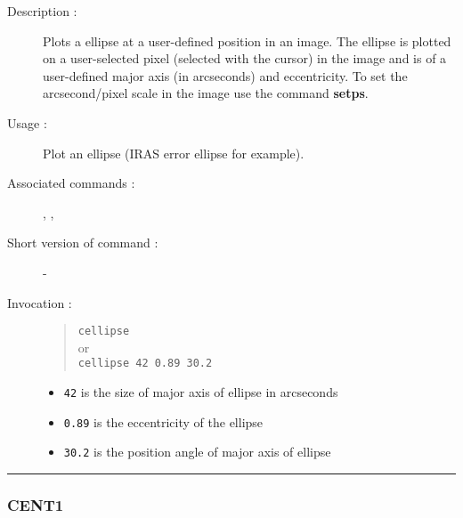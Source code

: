 \begin{description}

\item[Description :] Plots a ellipse at a user-defined position in an
image.  The ellipse is plotted on a user-selected pixel (selected with
the cursor) in the image and is of a user-defined major axis (in
arcseconds) and eccentricity.  To set the arcsecond/pixel scale in the
image use the command {\bf setps}.

\item[Usage :] Plot an ellipse (IRAS error ellipse for example).
\item[Associated commands :] {\tt {}}, 
{\tt {}}, {\tt {}}
\item[Short version of command :] -
\item[Invocation :]

\begin{quote}{\tt  cellipse }\\
or \\
{\tt cellipse 42 0.89 30.2 }
\end{quote}

\begin{itemize}

\item {\tt 42} is the size of major axis of ellipse in arcseconds
\item {\tt 0.89} is the eccentricity of the ellipse
\item {\tt 30.2} is the position angle of major axis of ellipse

\end{itemize}

\end{description}

\hrule 
\subsubsection*{\label{CENT1}CENT1}

